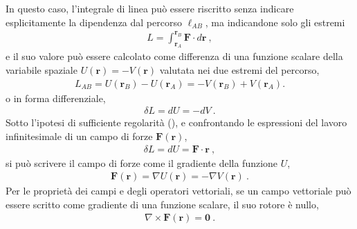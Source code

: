 \documentclass[letterpaper,10pt,english]{jupyterBook}
\begin{document}
\sphinxAtStartPar
In questo caso, l’integrale di linea può essere riscritto senza indicare esplicitamente la dipendenza dal percorso \(\ell_{AB}\), ma indicandone solo gli estremi
\begin{equation*}
\begin{split}L = \int_{\mathbf{r}_A}^{\mathbf{r}_B} \mathbf{F} \cdot d\mathbf{r} \ ,\end{split}
\end{equation*}
\sphinxAtStartPar
e il suo valore può essere calcolato come differenza di una funzione scalare della variabile spaziale \(U(\mathbf{r}) = -V(\mathbf{r})\) valutata nei due estremi del percorso,
\begin{equation*}
\begin{split}L_{AB} = U(\mathbf{r}_B) - U(\mathbf{r}_A) = - V(\mathbf{r}_B) + V(\mathbf{r}_A) .\end{split}
\end{equation*}
\sphinxAtStartPar
o in forma differenziale,
\begin{equation*}
\begin{split}\delta L = dU = - dV \ .\end{split}
\end{equation*}
\sphinxAtStartPar
Sotto l’ipotesi di sufficiente regolarità (), e confrontando le espressioni del lavoro infinitesimale di un campo di forze \(\mathbf{F}(\mathbf{r})\),
\begin{equation*}
\begin{split}\delta L = dU = \mathbf{F} \cdot \mathbf{r} \ ,\end{split}
\end{equation*}
\sphinxAtStartPar
si può scrivere il campo di forze come il gradiente della funzione \(U\),
\begin{equation*}
\begin{split}\mathbf{F}(\mathbf{r}) = \nabla U(\mathbf{r}) = - \nabla V(\mathbf{r} )\ .\end{split}
\end{equation*}
\sphinxAtStartPar
Per le proprietà dei campi e degli operatori vettoriali, se un campo vettoriale può essere scritto come gradiente di una funzione scalare, il suo rotore è nullo,
\begin{equation*}
\begin{split}\nabla \times \mathbf{F}(\mathbf{r}) = \mathbf{0} \ .\end{split}
\end{equation*}
\sphinxstepscope
\end{document}
